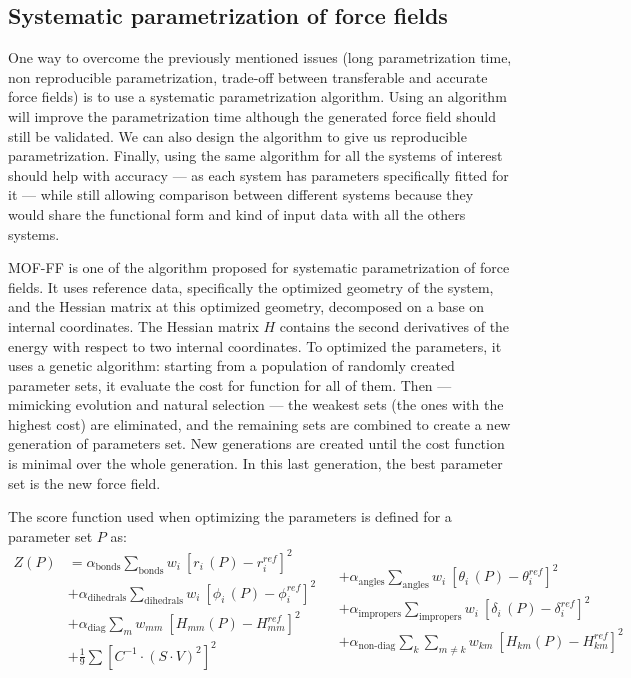 \documentclass[thesis]{subfiles}
\begin{document}
\subsection{Systematic parametrization of force fields}

One way to overcome the previously mentioned issues (long parametrization time,
non reproducible parametrization, trade-off between transferable and accurate
force fields) is to use a systematic parametrization algorithm. Using an
algorithm will improve the parametrization time although the generated force
field should still be validated. We can also design the algorithm to give us
reproducible parametrization. Finally, using the same algorithm for all the
systems of interest should help with accuracy --- as each system has parameters
specifically fitted for it --- while still allowing comparison between different
systems because they would share the functional form and kind of input data with
all the others systems.

MOF-FF\cite{Bureekaew2013} is one of the algorithm proposed for systematic
parametrization of force fields. It uses \abinitio reference data, specifically
the optimized geometry of the system, and the Hessian matrix at this optimized
geometry, decomposed on a base on internal coordinates. The Hessian matrix $H$
contains the second derivatives of the energy with respect to two internal
coordinates. To optimized the parameters, it uses a genetic algorithm: starting
from a population of randomly created parameter sets, it evaluate the cost for
function for all of them. Then --- mimicking evolution and natural selection ---
the weakest sets (the ones with the highest cost) are eliminated, and the
remaining sets are combined to create a new generation of parameters set. New
generations are created until the cost function is minimal over the whole
generation. In this last generation, the best parameter set is the new force
field.

The score function used when optimizing the parameters is defined for a
parameter set $P$ as:
\[
\begin{aligned}
    Z(P) &= \alpha_\text{bonds} \sum_\text{bonds} w_i \ \left[r_i\,(P) - r_i^{ref}\right]^2 \\
         &+ \alpha_\text{dihedrals} \sum_\text{dihedrals} w_i \ \left[\phi_i\,(P) - \phi_i^{ref}\right]^2 \\
         &+ \alpha_\text{diag} \sum_m w_{mm} \ \left[H_{mm}(P) - H_{mm}^{ref}\right]^2 \\
         &+ \frac 1 9 \sum \left[C^{-1} \cdot (S \cdot V)^2\right]^2 \\
\end{aligned}
\begin{aligned}
    &+ \alpha_\text{angles} \sum_\text{angles} w_i \ \left[\theta_i\,(P) - \theta_i^{ref}\right]^2 \\
    &+ \alpha_\text{impropers} \sum_\text{impropers} w_i \ \left[\delta_i\,(P) - \delta_i^{ref}\right]^2 \\
    &+ \alpha_\text{non-diag} \sum_k \sum_{m\neq k} w_{km} \ \left[H_{km}(P) - H_{km}^{ref}\right]^2 \\
    &~
\end{aligned}
\]
\end{document}
